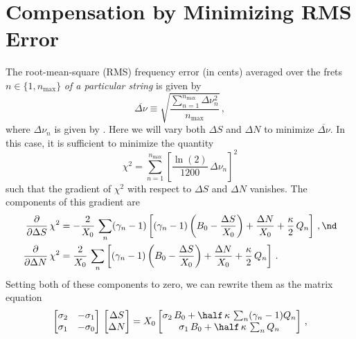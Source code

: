 %
%
%

 \section{Compensation by Minimizing RMS Error\label{app:rms}}

The root-mean-square (RMS) frequency error (in cents) averaged over the frets $n \in \{1, n_\text{max}\}$ \emph{of a particular string} is given by
 \begin{equation}\label{eqn:rms_def}
\overline{\Delta \nu} \equiv \sqrt{\frac{\sum_{n = 1}^{n_\text{max}} \Delta \nu_n^2}{n_\text{max}}}\, ,
 \end{equation}
where $\Delta \nu_n$ is given by . Here we will vary both $\Delta S$ and $\Delta N$ to minimize $\overline{\Delta \nu}$. In this case, it is sufficient to minimize the quantity
 \begin{equation}\label{eqn:chi2_def}
\chi^2 = \sum_{n = 1}^{n_\text{max}} \left[\frac{\ln(2)}{1200}\, \Delta \nu_n\right]^2
 \end{equation}
such that the gradient of $\chi^2$ with respect to $\Delta S$ and $\Delta N$ vanishes. The components of this gradient are
 \begin{subequations}\label{chi2_grad}
 \begin{align}
\frac{\partial}{\partial \Delta S}\, \chi^2 &= -\frac{2}{X_0}\, \sum_n (\gamma_n - 1)\left[ (\gamma_n - 1) \left(B_0 - \frac{\Delta S}{X_0}\right) + \frac{\Delta N}{X_0} + \frac{\kappa}{2}\, Q_n \right]\, , \nd \\
\frac{\partial}{\partial \Delta N}\, \chi^2 &= \frac{2}{X_0}\, \sum_n \left[ (\gamma_n - 1) \left(B_0 - \frac{\Delta S}{X_0}\right) + \frac{\Delta N}{X_0} + \frac{\kappa}{2}\, Q_n \right]\, .
 \end{align}
 \end{subequations}
Setting both of these components to zero, we can rewrite them as the matrix equation
 \begin{equation} \label{eqn:rms_mat}
\begin{bmatrix}
  \sigma_2 & -\sigma_1 \\
  \sigma_1 & -\sigma_0
\end{bmatrix}\,
\begin{bmatrix}
  \Delta S \\
  \Delta N
\end{bmatrix} = X_0
\begin{bmatrix}
  \sigma_2\, B_0 +  \half\, \kappa\, \sum_n (\gamma_n - 1) Q_n\\
  \sigma_1\, B_0 +  \half\, \kappa\, \sum_n Q_n
\end{bmatrix}\, ,
 \end{equation}
